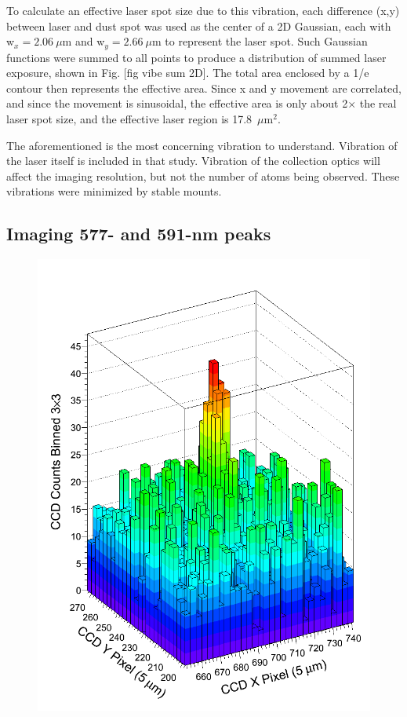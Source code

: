 To calculate an effective laser spot size due to this vibration, each difference (x,y) between laser and dust spot was used as the center of a 2D Gaussian, each with w$_{x} = 2.06~\mu$m and w$_{y} = 2.66~\mu$m to represent the laser spot.  Such Gaussian functions were summed to all points to produce a distribution of summed laser exposure, shown in Fig. [fig vibe sum 2D].  The total area enclosed by a 1/e contour then represents the effective area.  Since x and y movement are correlated, and since the movement is sinusoidal, the effective area is only about 2$\times$ the real laser spot size, and the effective laser region is 17.8~$\mu$m$^{2}$.

The aforementioned is the most concerning vibration to understand.  Vibration of the laser itself is included in that study.  Vibration of the collection optics will affect the imaging resolution, but not the number of atoms being observed.  These vibrations were minimized by stable mounts.

\subsection{Imaging 577- and 591-nm peaks}

\begin{figure} %
        \centering
                \includegraphics[width=.6\textwidth]{figures/image_1e4.png}
                \caption{}
\label{fig:image590s}
\end{figure}

